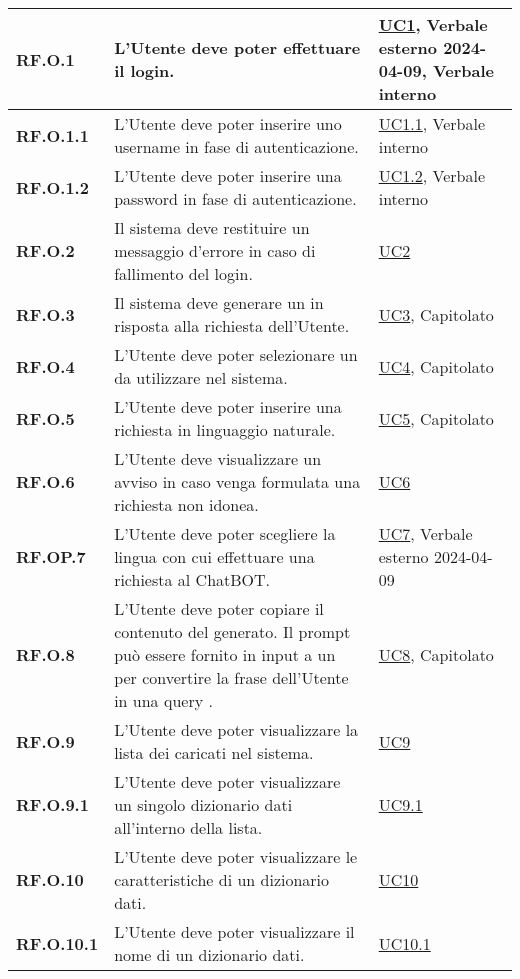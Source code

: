 \begin{adjustwidth}{-0.5cm}{-0.5cm}
\begin{longtable}{|P{3cm}|P{6,5cm}|>{\arraybackslash}P{4cm}|}
    \textbf{RF.O.1} & L'Utente deve poter effettuare il login. & \hyperref[UC1]{UC1}, Verbale esterno 2024-04-09, Verbale interno\\
    \hline
    \textbf{RF.O.1.1} & L'Utente deve poter inserire uno username in fase di autenticazione. & \hyperref[UC1point1]{UC1.1}, Verbale interno\\
    \hline
    \textbf{RF.O.1.2} & L'Utente deve poter inserire una password in fase di autenticazione. & \hyperref[UC1point2]{UC1.2}, Verbale interno\\
    \hline
    \textbf{RF.O.2} & Il sistema deve restituire un messaggio d'errore in caso di fallimento del login. & \hyperref[UC2]{UC2}\\
    \hline
    \textbf{RF.O.3} & Il sistema deve generare un  in risposta alla richiesta dell'Utente. & \hyperref[UC3]{UC3}, Capitolato\\
    \hline
    \textbf{RF.O.4} & L'Utente deve poter selezionare un  da utilizzare nel sistema. & \hyperref[UC4]{UC4}, Capitolato\\
    \hline
    \textbf{RF.O.5} & L'Utente deve poter inserire una richiesta in linguaggio naturale. & \hyperref[UC5]{UC5}, Capitolato\\
    \hline
    \textbf{RF.O.6} & L'Utente deve visualizzare un avviso in caso venga formulata una richiesta non idonea. & \hyperref[UC6]{UC6}\\
    \hline
    \textbf{RF.OP.7} & L'Utente deve poter scegliere la lingua con cui effettuare una richiesta al ChatBOT. & \hyperref[UC7]{UC7}, Verbale esterno 2024-04-09\\
    \hline
    \textbf{RF.O.8} & L'Utente deve poter copiare il contenuto del  generato. Il prompt può essere fornito in input a un  per convertire la frase dell'Utente in una query . & \hyperref[UC8]{UC8}, Capitolato\\
    \hline
    \textbf{RF.O.9} & L'Utente deve poter visualizzare la lista dei  caricati nel sistema. & \hyperref[UC9]{UC9}\\
    \hline
    \textbf{RF.O.9.1} & L'Utente deve poter visualizzare un singolo dizionario dati all'interno della lista. & \hyperref[UC9point1]{UC9.1}\\
    \hline
    \textbf{RF.O.10} & L'Utente deve poter visualizzare le caratteristiche di un dizionario dati. & \hyperref[UC10]{UC10}\\
    \hline
    \textbf{RF.O.10.1} & L'Utente deve poter visualizzare il nome di un dizionario dati. & \hyperref[UC10point1]{UC10.1}\\

\end{longtable}
\end{adjustwidth}
